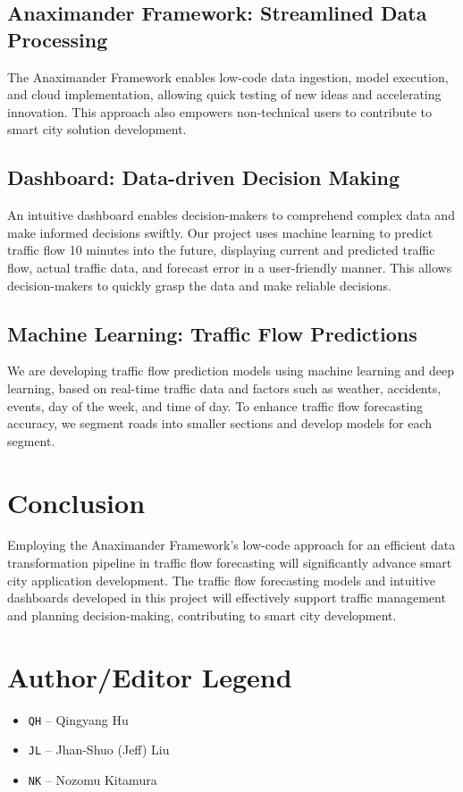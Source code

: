 \documentclass[12pt]{article}
\begin{document}
\subsection{Anaximander Framework: Streamlined Data Processing}
 The Anaximander Framework enables low-code data ingestion, model execution, and cloud implementation, allowing quick testing of new ideas and accelerating innovation. This approach also empowers non-technical users to contribute to smart city solution development.
\subsection{Dashboard: Data-driven Decision Making}
 An intuitive dashboard enables decision-makers to comprehend complex data and make informed decisions swiftly. Our project uses machine learning to predict traffic flow 10 minutes into the future, displaying current and predicted traffic flow, actual traffic data, and forecast error in a user-friendly manner. This allows decision-makers to quickly grasp the data and make reliable decisions.
\subsection{Machine Learning: Traffic Flow Predictions}
 We are developing traffic flow prediction models using machine learning and deep learning, based on real-time traffic data and factors such as weather, accidents, events, day of the week, and time of day. To enhance traffic flow forecasting accuracy, we segment roads into smaller sections and develop models for each segment.
\section{Conclusion}
 Employing the Anaximander Framework's low-code approach for an efficient data transformation pipeline in traffic flow forecasting will significantly advance smart city application development. The traffic flow forecasting models and intuitive dashboards developed in this project will effectively support traffic management and planning decision-making, contributing to smart city development.

\newpage
\printbibliography[heading=bibintoc, title={References}]


\newpage
\appendix
\singlespacing
\section{Author/Editor Legend}
\begin{itemize}
    \item {\tt QH} -- Qingyang Hu
    \item {\tt JL} -- Jhan-Shuo (Jeff) Liu
    \item {\tt NK} -- Nozomu Kitamura
\end{itemize}
\end{document}
